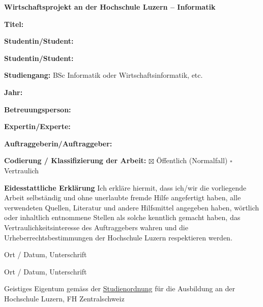 \setlength\parindent{0pt}
\thispagestyle{empty}

\textbf{Wirtschaftsprojekt an der Hochschule Luzern – Informatik}
\vspace*{10mm}

\textbf{Titel: }
\vspace*{5mm}

\textbf{Studentin/Student: }
\newline

\textbf{Studentin/Student: }
\newline

\textbf{Studiengang: }BSc Informatik oder Wirtschaftsinformatik, etc.
\newline

\textbf{Jahr:}
\newline

\textbf{Betreuungsperson: }
\newline

\textbf{Expertin/Experte: }
\newline

\textbf{Auftraggeberin/Auftraggeber: }
\vspace*{10mm}

\textbf{Codierung / Klassifizierung der Arbeit:}
\newline
$\boxtimes$ Öffentlich (Normalfall)
\newline
$\square$ Vertraulich
\vspace*{10mm}

\textbf{Eidesstattliche Erklärung}
Ich erkläre hiermit, dass ich/wir die vorliegende Arbeit selbständig und ohne unerlaubte fremde Hilfe angefertigt haben, alle verwendeten Quellen, Literatur und andere Hilfsmittel angegeben haben, wörtlich oder inhaltlich entnommene Stellen als solche kenntlich gemacht haben, das Vertraulichkeitsinteresse des Auftraggebers wahren und die Urheberrechtsbestimmungen der Hochschule Luzern respektieren werden.
\vspace*{10mm}

Ort / Datum, Unterschrift \underline{\hspace{80mm}}
\newline

Ort / Datum, Unterschrift \underline{\hspace{80mm}}

\mbox{}\vfill

Geistiges Eigentum gemäss der \href{https://srl.lu.ch/app/de/texts_of_law/521/versions/3884}{Studienordnung} für die Ausbildung  an der Hochschule Luzern, FH Zentralschweiz

\setlength\parindent{15pt}
\newpage
